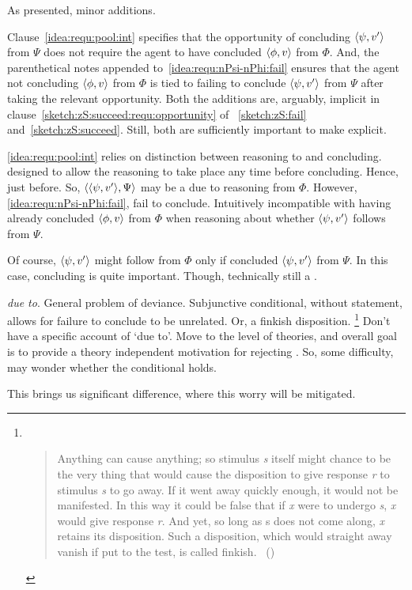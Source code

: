 \begin{note}
  As presented, minor additions.

  Clause~\ref{idea:requ:pool:int} specifies that the opportunity of concluding \(\langle \psi, v' \rangle\) from \(\Psi\) does not require the agent to have concluded \(\langle \phi, v \rangle\) from \(\Phi\).
  And, the parenthetical notes appended to~\ref{idea:requ:nPsi-nPhi:fail} ensures that the agent not concluding \(\langle \phi, v \rangle\) from \(\Phi\) is tied to failing to conclude \(\langle \psi, v' \rangle\) from \(\Psi\) after taking the relevant opportunity.
  Both the additions are, arguably, implicit in clause~\ref{sketch:zS:succeed:requ:opportunity} of ~\ref{sketch:zS:fail} and~\ref{sketch:zS:succeed}.
  Still, both are sufficiently important to make explicit.

  \ref{idea:requ:pool:int} relies on distinction between reasoning to and concluding.
   designed to allow the reasoning to take place any time before concluding.
  Hence, just before.
  So, \(\langle \langle \psi, v' \rangle, \Psi \rangle\) may be a \requ{} due to reasoning from \(\Phi\).
  However, \ref{idea:requ:nPsi-nPhi:fail}, fail to conclude.
  Intuitively incompatible with having already concluded \(\langle \phi, v \rangle\) from \(\Phi\) when reasoning about whether \(\langle \psi, v' \rangle\) follows from \(\Psi\).

  Of course, \(\langle \psi, v' \rangle\) might follow from \(\Phi\) only if concluded \(\langle \psi, v' \rangle\) from \(\Psi\).
  In this case, concluding is quite important.
  Though, technically still a \requ{}.

  \emph{due to}.
  General problem of deviance.
  Subjunctive conditional, without statement, allows for failure to conclude to be unrelated.
  Or, a finkish disposition.%
  \footnote{
    ~\cite{Lewis:1997wg}
    \begin{quote}
      Anything can cause anything; so stimulus \emph{s} itself might chance to be the very thing that would cause the disposition to give response \emph{r} to stimulus \emph{s} to go away.
      If it went away quickly enough, it would not be manifested.
      In this way it could be false that if \emph{x} were to undergo \emph{s}, \emph{x} would give response \emph{r}.
      And yet, so long as s does not come along, \emph{x} retains its disposition.
      Such a disposition, which would straight away vanish if put to the test, is called finkish.%
      \mbox{ }\hfill\mbox{(\citeyear[144]{Lewis:1997wg})}
    \end{quote}
  }
  Don't have a specific account of `due to'.
  Move to the level of theories, and overall goal is to provide a theory independent motivation for rejecting \issueConstraint{}.
  So, some difficulty, may wonder whether the conditional holds.

  This brings us significant difference, where this worry will be mitigated.
\end{note}

